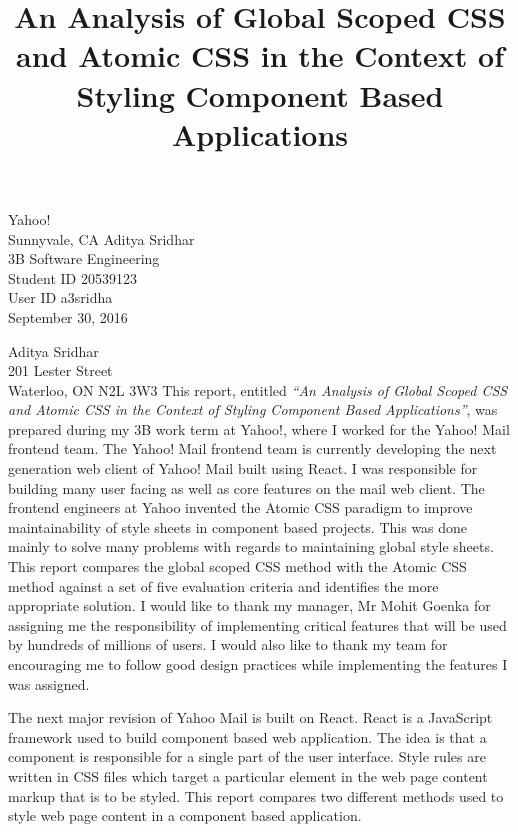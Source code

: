 \documentclass[12pt]{article}
\begin{document}
\title{An Analysis of Global Scoped CSS and Atomic CSS in the Context of Styling Component Based Applications}
{
	Yahoo!\\
	Sunnyvale, CA
}
{
	Aditya Sridhar\\
	3B Software Engineering\\
	Student ID 20539123\\
	User ID a3sridha\\
	September 30, 2016
}


{
	\noindent
	Aditya Sridhar\\
	201 Lester Street\\
	Waterloo, ON N2L 3W3
}
{
	\noindent
	This report, entitled \textit{“An Analysis of Global Scoped CSS and Atomic CSS in the Context of Styling Component Based Applications”}, was prepared during my 3B work term at Yahoo!, where I worked for the Yahoo! Mail frontend team.
}
{
	\noindent
	The Yahoo! Mail frontend team is currently developing the next generation web client of Yahoo! Mail built using React. I was responsible for building many user facing as well as core features on the mail web client.
}
{
	\noindent
	The frontend engineers at Yahoo invented the Atomic CSS paradigm to improve maintainability of style sheets in component based projects. This was done mainly to solve many problems with regards to maintaining global style sheets. This report compares the global scoped CSS method with the Atomic CSS method against a set of five evaluation criteria and identifies the more appropriate solution.
}
{
	\noindent
	I would like to thank my manager, Mr Mohit Goenka for assigning me the responsibility of implementing critical features that will be used by hundreds of millions of users. I would also like to thank my team for encouraging me to follow good design practices while implementing the features I was assigned.
}



The next major revision of Yahoo Mail is built on React. React is a JavaScript framework used to build component based web application. The idea is that a component is responsible for a single part of the user interface. Style rules are written in CSS files which target a particular element in the web page content markup that is to be styled. This report compares two different methods used to style web page content in a component based application.
\end{document}

